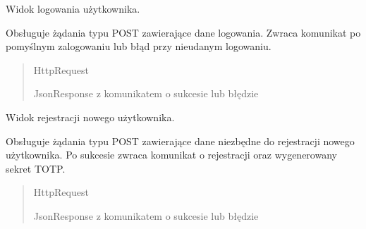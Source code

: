 \documentclass[letterpaper,10pt,polish]{sphinxmanual}
\begin{document}
\begin{fulllineitems}
\label{\detokenize{mainApp:mainApp.views.login_view}}
\pysigstartsignatures
{}
\pysigstopsignatures
\sphinxAtStartPar
Widok logowania użytkownika.

\sphinxAtStartPar
Obsługuje żądania typu POST zawierające dane logowania.
Zwraca komunikat po pomyślnym zalogowaniu lub błąd przy nieudanym logowaniu.
\begin{quote}\begin{description}
\sphinxAtStartPar
{} \textendash{} HttpRequest

\sphinxAtStartPar
JsonResponse z komunikatem o sukcesie lub błędzie

\end{description}\end{quote}

\end{fulllineitems}


\begin{fulllineitems}
\label{\detokenize{mainApp:mainApp.views.register_view}}
\pysigstartsignatures
{}
\pysigstopsignatures
\sphinxAtStartPar
Widok rejestracji nowego użytkownika.

\sphinxAtStartPar
Obsługuje żądania typu POST zawierające dane niezbędne do rejestracji nowego użytkownika.
Po sukcesie zwraca komunikat o rejestracji oraz wygenerowany sekret TOTP.
\begin{quote}\begin{description}
\sphinxAtStartPar
{} \textendash{} HttpRequest

\sphinxAtStartPar
JsonResponse z komunikatem o sukcesie lub błędzie

\end{description}\end{quote}

\end{fulllineitems}
\end{document}
